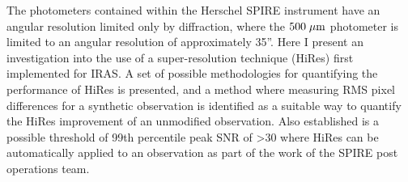 The photometers contained within the Herschel SPIRE instrument have an angular resolution limited only by diffraction, where the $500\;\mathrm{\mu m}$ photometer is limited to an angular resolution of approximately 35''. Here I present an investigation into the use of a super-resolution technique (HiRes) first implemented for IRAS. A set of possible methodologies for quantifying the performance of HiRes is presented, and a method where measuring RMS pixel differences for a synthetic observation is identified as a suitable way to quantify the HiRes improvement of an unmodified observation. Also established is a possible threshold of 99th percentile peak SNR of \textgreater30 where HiRes can be automatically applied to an observation as part of the work of the SPIRE post operations team.
